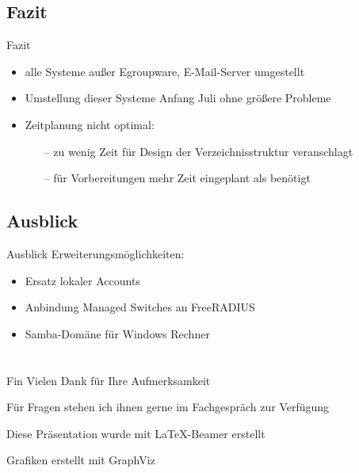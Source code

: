 \documentclass[presentation,svgnames,12pt]{beamer}
\begin{document}
\subsection{Fazit}
\begin{frame}{Fazit}
\begin{itemize}
	\item alle Systeme außer Egroupware, E-Mail-Server umgestellt
	\item Umstellung dieser Systeme Anfang Juli ohne größere Probleme
	\item Zeitplanung nicht optimal:
	\vspace{6pt}
	\begin{itemize}
		\item[--] zu wenig Zeit für Design der Verzeichnisstruktur veranschlagt
		\item[--] für Vorbereitungen mehr Zeit eingeplant als benötigt
	\end{itemize}
\end{itemize}
\end{frame}


\subsection{Ausblick}
\begin{frame}{Ausblick}
Erweiterungsmöglichkeiten:
\vspace{8pt}
	\begin{itemize}
		\item Ersatz lokaler Accounts
		\item Anbindung Managed Switches an FreeRADIUS
		\item Samba-Domäne für Windows Rechner
	\end{itemize}
\end{frame}


\section{} %
\begin{frame}{Fin}
	\bigskip\bigskip\bigskip\bigskip\bigskip\bigskip
	Vielen Dank für Ihre Aufmerksamkeit
	
	Für Fragen stehen ich ihnen gerne im Fachgespräch zur Verfügung
	
	\bigskip\bigskip\bigskip
	\bigskip
	\bigskip
	\bigskip Diese Präsentation wurde mit \LaTeX{}-Beamer erstellt
	
	Grafiken erstellt mit GraphViz
\end{frame}
\end{document}
